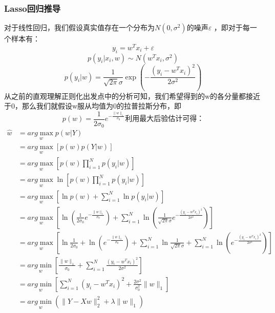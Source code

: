 \documentclass[forprint]{report}
\begin{document}
\subsubsection{Lasso回归推导}
对于线性回归，我们假设真实值存在一个分布为$N\left( 0,\sigma ^2 \right)$的噪声$\varepsilon$ ，即对于每一个样本有：
$$
y_i=w^Tx_i+\varepsilon 
$$
$$
p\left( y_i|x_i,w \right) \sim N\left( w^Tx_i,\sigma ^2 \right) 
$$
$$
p\left( y_i|w \right) =\frac{1}{\sqrt{2\pi}\sigma}\exp \left( -\frac{\left( y_i-w^Tx_i \right) ^2}{2\sigma ^2} \right) 
$$
从之前的直观理解正则化出发点中的分析可知，我们希望得到的w的各分量都接近于0，那么我们就假设w服从均值为0的拉普拉斯分布，即
$$
p\left( w \right) =\frac{1}{2\sigma _0}e^{-\frac{\lVert w \rVert _1}{\sigma _0}}
利用最大后验估计可得：
$$
$$
\begin{aligned}
\widehat{w}&=\underset{w}{arg\max}p\left( w|Y \right) 
\\
&=\underset{w}{arg\max}\left[ p\left( w \right) p\left( Y|w \right) \right] 
\\
&=\underset{w}{arg\max}\left[ p\left( w \right) \prod_{i=1}^N{p\left( y_i|w \right)} \right] 
\\
&=\underset{w}{arg\max}\ln \left[ p\left( w \right) \prod_{i=1}^N{p\left( y_i|w \right)} \right] 
\\
&=\underset{w}{arg\max}\left[ \ln p\left( w \right) +\sum_{i=1}^N{\ln p\left( y_i|w \right)} \right] 
\\
&=\underset{w}{arg\max}\left[ \ln \left( \frac{1}{2\sigma _0}e^{-\frac{\lVert w \rVert _1}{\sigma _0}} \right) +\sum_{i=1}^N{\ln \left( \frac{1}{\sqrt{2\pi}\sigma}e^{-\frac{\left( y_i-w^Tx_i \right) ^2}{2\sigma ^2}} \right)} \right] 
\\
&=\underset{w}{arg\max}\left[ \ln \frac{1}{2\sigma _0}+\ln \left( e^{-\frac{\lVert w \rVert _1}{\sigma _0}} \right) +\sum_{i=1}^N{\ln \frac{1}{\sqrt{2\pi}\sigma}}+\sum_{i=1}^N{\ln \left( e^{-\frac{\left( y_i-w^Tx_i \right) ^2}{2\sigma ^2}} \right)} \right] 
\\
&=\underset{w}{arg\min}\left[ \frac{\lVert w \rVert _1}{\sigma _0}+\sum_{i=1}^N{\frac{\left( y_i-w^Tx_i \right) ^2}{2\sigma ^2}} \right] 
\\
&=\underset{w}{arg\min}\left[ \sum_{i=1}^N{\left( y_i-w^Tx_i \right) ^2+\frac{2\sigma ^2}{\sigma _{0}^{2}}\lVert w \rVert _1} \right] 
\\
&=\underset{w}{arg\min}\left( \lVert Y-Xw \rVert _{2}^{2}+\lambda \lVert w \rVert _1 \right) 
\end{aligned}
$$
\end{document}
